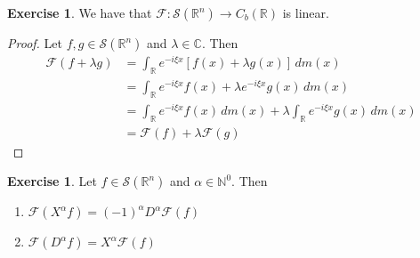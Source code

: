 \documentclass[12pt]{amsart}
\theoremstyle{definition}
\newtheorem{ex}[definition]{Exercise}
\newcommand{\al}{\alpha}
\newcommand{\lam}{\lambda}
\newcommand{\C}{\mathbb{C}}
\newcommand{\N}{\mathbb{N}}
\newcommand{\R}{\mathbb{R}}
\newcommand{\MF}{\mathcal{F}}
\newcommand{\MS}{\mathcal{S}}
\newcommand{\dm}{\, d m}
\begin{document}
	\begin{ex}
		We have that $\MF: \MS(\R^n) \rightarrow C_b(\R)$ is linear. 
	\end{ex}
	
	\begin{proof}
		Let $f,g \in \MS(\R^n)$ and $\lam \in \C$. Then 
		\begin{align*}
			\MF(f + \lam g) 
			& = \int_{\R} e^{-i \xi x} [f(x) + \lam g(x)] \dm(x) \\
			& = \int_{\R} e^{-i \xi x} f(x) + \lam e^{-i \xi x} g(x) \dm(x) \\
			& = \int_{\R} e^{-i \xi x} f(x) \dm(x) + \lam \int_{\R} e^{-i \xi x} g(x) \dm(x) \\
			&= \MF(f) + \lam \MF(g)
		\end{align*}
	\end{proof}

	\begin{ex}
		Let $f \in \MS(\R^n)$ and $\al \in \N^0$. Then 
		\begin{enumerate}
			\item $\MF(X^{\al}f) = (-1)^{\al}D^{\al} \MF(f)$ 
			\item $\MF(D^{\al}f) = X^{\al} \MF(f)$
		\end{enumerate}
	\end{ex}
	
\end{document}
